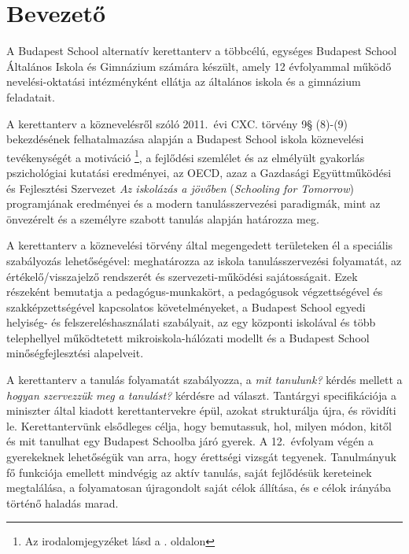 \chapter{Bevezető}
A Budapest School alternatív kerettanterv a többcélú, egységes	Budapest School
Általános Iskola és Gimnázium számára készült, amely 12 évfolyammal működő
nevelési-oktatási intézményként ellátja az általános iskola és a gimnázium
feladatait.

A kerettanterv a köznevelésről szóló 2011.~évi CXC. törvény 9§ (8)-(9)
bekezdésének felhatalmazása alapján a Budapest School iskola köznevelési
tevékenységét a motiváció \citep{pink2011drive}\footnote{Az irodalomjegyzéket
    lásd a \pageref{sec:bibliographyk}. oldalon}, a fejlődési szemlélet
\citep{growthmindset} és az elmélyült gyakorlás \citep{ericsson2016peak}
pszichológiai kutatási eredményei, az  OECD, azaz a Gazdasági Együttműködési és
Fejlesztési Szervezet \emph{Az iskolázás a jövőben}  (\emph{Schooling for Tomorrow})
programjának eredményei \citep{2006schooling}
és a modern tanulásszervezési paradigmák, mint az önvezérelt
\citep{mitra2012beyond} és a személyre szabott \citep{khan2012one} tanulás
alapján határozza meg.

A kerettanterv a köznevelési törvény által megengedett területeken él a
speciális szabályozás lehetőségével: meghatározza az iskola tanulásszervezési
folyamatát, az értékelő/visszajelző rendszerét és szervezeti-működési
sajátosságait. Ezek részeként bemutatja a pedagógus-munkakört, a pedagógusok
végzettségével és szakképzettségével kapcsolatos követelményeket, a Budapest
School	egyedi helyiség- és felszereléshasználati szabályait, az egy központi
iskolával és több telephellyel működtetett mikroiskola-hálózati modellt és a
Budapest School minőségfejlesztési alapelveit.

A kerettanterv	a tanulás folyamatát szabályozza, a \emph{mit tanulunk?} kérdés
mellett a \emph{hogyan szervezzük meg a tanulást?} kérdésre ad választ.
Tantárgyi specifikációja a miniszter által kiadott kerettantervekre
\citep{ofi:kerettanterv} épül, azokat strukturálja újra, és rövidíti le.
Kerettantervünk elsődleges célja, hogy bemutassuk, hol, milyen módon, kitől és
mit tanulhat egy Budapest Schoolba járó gyerek. A 12.~évfolyam
végén a gyerekeknek lehetőségük van arra, hogy érettségi vizsgát tegyenek. Tanulmányuk
fő funkciója emellett mindvégig az aktív tanulás, saját fejlődésük kereteinek
megtalálása, a folyamatosan újragondolt saját célok állítása, és e célok
irányába történő haladás marad.

